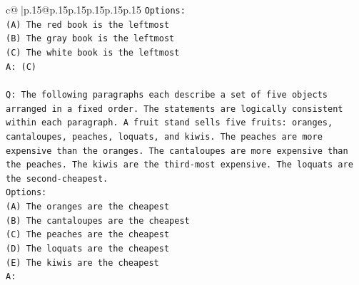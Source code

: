 \documentclass{article}
\begin{document}
{\begin{supertabular}{c@{$\;$}|p{.15\linewidth}@{}p{.15\linewidth}p{.15\linewidth}p{.15\linewidth}p{.15\linewidth}p{.15\linewidth}}
{{{\texttt{Options:} \\
\texttt{(A) The red book is the leftmost} \\
\texttt{(B) The gray book is the leftmost} \\
\texttt{(C) The white book is the leftmost} \\
\texttt{A: (C)} \\
\\ 
\texttt{Q: The following paragraphs each describe a set of five objects arranged in a fixed order. The statements are logically consistent within each paragraph. A fruit stand sells five fruits: oranges, cantaloupes, peaches, loquats, and kiwis. The peaches are more expensive than the oranges. The cantaloupes are more expensive than the peaches. The kiwis are the third{-}most expensive. The loquats are the second{-}cheapest.} \\
\texttt{Options:} \\
\texttt{(A) The oranges are the cheapest} \\
\texttt{(B) The cantaloupes are the cheapest} \\
\texttt{(C) The peaches are the cheapest} \\
\texttt{(D) The loquats are the cheapest} \\
\texttt{(E) The kiwis are the cheapest} \\
\texttt{A:} \\
            }
        }
    }
     \\ \\


\end{supertabular}}
\end{document}
